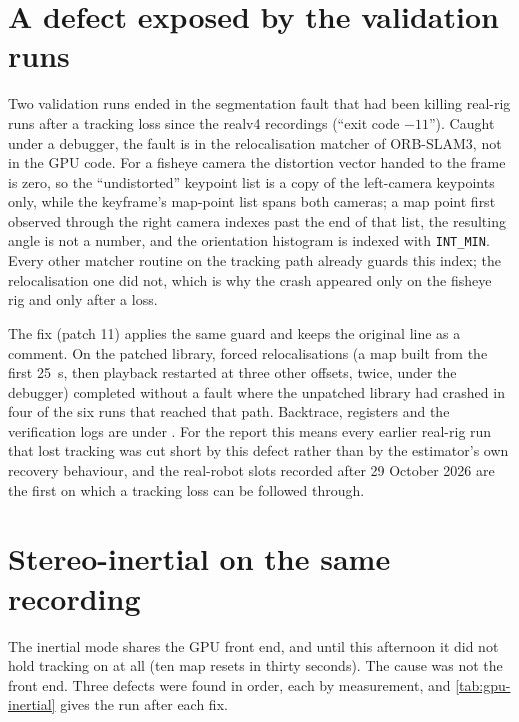 \documentclass[11pt,a4paper,notitlepage]{report}
\begin{document}
\section{A defect exposed by the validation runs}
\label{sec:gpu-defect}

Two validation runs ended in the segmentation fault that had been killing
real-rig runs after a tracking loss since the realv4 recordings
(``exit code \(-11\)''). Caught under a debugger, the fault is in the
relocalisation matcher of ORB-SLAM3, not in the GPU code. For a fisheye
camera the distortion vector handed to the frame is zero, so the
``undistorted'' keypoint list is a copy of the left-camera keypoints only,
while the keyframe's map-point list spans both cameras; a map point first
observed through the right camera indexes past the end of that list, the
resulting angle is not a number, and the orientation histogram is indexed
with \texttt{INT\_MIN}. Every other matcher routine on the tracking path
already guards this index; the relocalisation one did not, which is why the
crash appeared only on the fisheye rig and only after a loss.

The fix (patch 11) applies the same guard and keeps the original line as a
comment. On the patched library, forced relocalisations (a map built from the
first \SI{25}{\second}, then playback restarted at three other offsets, twice,
under the debugger) completed without a fault where the unpatched library
had crashed in four of the six runs that reached that path. Backtrace,
registers and the verification logs are under
. For the report this
means every earlier real-rig run that lost tracking was cut short by this
defect rather than by the estimator's own recovery behaviour, and the
real-robot slots recorded after 29 October 2026 are the first on which a
tracking loss can be followed through.

\section{Stereo-inertial on the same recording}
\label{sec:gpu-inertial}

The inertial mode shares the GPU front end, and until this afternoon it did not
hold tracking on  at all (ten map resets in thirty
seconds). The cause was not the front end. Three defects were found in order,
each by measurement, and \cref{tab:gpu-inertial} gives the run after each fix.
\end{document}
